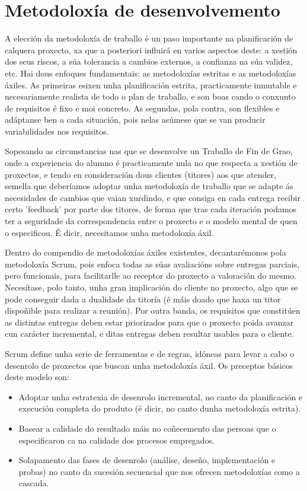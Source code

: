 \section{Metodoloxía de desenvolvemento}

A elección da metodoloxía de traballo é un paso importante na planificación de calquera proxecto, xa que a posteriori influirá en varios aspectos deste: a xestión dos seus riscos, a súa tolerancia a cambios externos, a confianza na súa validez, etc. Hai dous enfoques fundamentais: as metodoloxías estritas e as metodoloxías áxiles. As primeiras esixen unha planificación estrita, practicamente inmutable e necesariamente realista de todo o plan de traballo, e son boas cando o conxunto de requisitos é fixo e moi concreto. As segundas, pola contra, son flexibles e adáptanse ben a cada situación, pois nelas asúmese que se van producir variabilidades nos requisitos.

Sopesando as circunstancias nas que se desenvolve un Traballo de Fin de Grao, onde a experiencia do alumno é practicamente nula no que respecta a xestión de proxectos, e tendo en consideración dous clientes (titores) aos que atender, semella que deberíamos adoptar unha metodoloxía de traballo que se adapte ás necesidades de cambios que vaian xurdindo, e que consiga en cada entrega recibir certo 'feedback' por parte dos titores, de forma que tras cada iteración podamos ter a seguridade da correspondencia entre o proxecto e o modelo mental de quen o especificou. É dicir, necesitamos unha metodoloxía áxil.

Dentro do compendio de metodoloxías áxiles existentes, decantarémonos pola metodoloxía Scrum\cite{scrum}, pois enfoca todas as súas avaliacións sobre entregas parciais, pero funcionais, para facilitarlle ao receptor do proxecto a valoración do mesmo. Necesítase, polo tanto, unha gran implicación do cliente no proxecto, algo que se pode conseguir dada a dualidade da titoría (é máis doado que haxa un titor dispoñible para realizar a reunión). Por outra banda, os requisitos que constitúen as distintas entregas deben estar priorizados para que o proxecto poida avanzar cun carácter incremental, e ditas entregas deben resultar usables para o cliente.

Scrum define unha serie de ferramentas e de regras, idóneas para levar a cabo o desenrolo de proxectos que buscan unha metodoloxía áxil. Os preceptos básicos deste modelo son:

\begin{itemize}
\item Adoptar unha estratexia de desenrolo incremental, no canto da planificación e execución completa do produto (é dicir, no canto dunha metodoloxía estrita).
\item Basear a calidade do resultado máis no coñecemento das persoas que o especificaron ca na calidade dos procesos empregados.
\item Solapamento das fases de desenrolo (análise, deseño, implementación e probas) no canto da sucesión secuencial que nos ofrecen metodoloxías como a cascada.
\end{itemize} 

